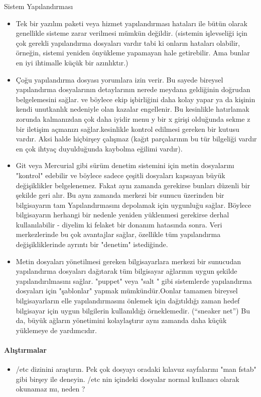 \begin{section}{Sistem Yapılandırması}
\begin{itemize}
\item Tek bir yazılım paketi veya hizmet yapılandırması hataları ile bütün olarak genellikle sisteme zarar verilmesi mümkün değildir. (sistemin işlevseliği için çok gerekli yapılandırma dosyaları vardır tabi ki onların hataları olabilir, örneğin, sistemi yeniden önyükleme yapamayan hale getirebilir. Ama bunlar en iyi ihtimalle küçük bir azınlıktır.)
\item Çoğu yapılandırma dosyası yorumlara izin verir. Bu sayede bireysel yapılandırma dosyalarının detaylarının nerede meydana geldiğinin doğrudan  belgelemesini sağlar. ve böylece ekip işbirliğini daha kolay yapar ya da kişinin kendi unutkanlık nedeniyle olan kazalar engellenir. Bu kesinlikle hatırlamak zorunda kalmanızdan çok daha iyidir menu y bir x girişi olduğunda sekme z bir iletişim açmanızı sağlar.kesinlikle kontrol edilmesi gereken bir kutusu vardır. Aksi halde hiçbirşey çalışmaz (kağıt parçalarının bu tür bilgeliği vardır en çok ihtyaç duyulduğunda kaybolma eğilimi vardır).
\item Git veya Mercurial gibi sürüm denetim sistemini için metin dosyalarını "kontrol" edebilir ve  böylece sadece çeşitli dosyaları kapsayan büyük değişiklikler belgelenemez. Fakat aynı zamanda gerekirse bunları düzenli bir şekilde geri alır. Bu aynı zamanda merkezi bir sunucu üzerinden bir bilgisayarın tam Yapılandırmasını depolamak için  uygunluğu sağlar. Böylece bilgisayarın herhangi bir nedenle yeniden yüklenmesi gerekirse derhal kullanılabilir - diyelim ki felaket bir donanım hatasında sonra. Veri merkezlerinde bu  çok avantajlar sağlar, özellikle tüm yapılandırma değişikliklerinde ayrıntı bir "denetim" istediğinde.
\item Metin dosyaları yönetilmesi gereken bilgisayarlara merkezi bir sunucudan yapılandırma dosyaları dağıtarak tüm bilgisayar ağlarının uygun şekilde yapılandırılmasını sağlar. "puppet" veya "salt " gibi sistemlerde yapılandırma dosyaları için "şablonlar" yapmak mümkündür.Oonlar tamamen bireysel bilgisayarların elle yapılandırmasını önlemek için dağıtıldığı zaman hedef bilgisayar için uygun bilgilerin kullanıldığı  örneklemedir. (“sneaker net”) Bu da, büyük ağların yönetimini kolaylaştırır  aynı zamanda daha küçük yüklemeye de yardımcıdır.
\end{itemize}
\paragraph{Alıştırmalar}{
\begin{itemize}
 \item /etc dizinini araştırın. Pek çok dosyayı oradaki kılavuz sayfalarını "man fstab" gibi birşey ile deneyin. /etc nin içindeki dosyalar normal kullanıcı olarak okunamaz mı,  neden ?
\end{itemize}}
\end{section}
